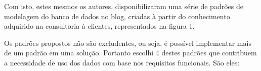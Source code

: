 \documentclass[
	12pt,				%
	openright,			%
	oneside,			%
	a4paper,			%
	english,			%
	french,				%
	spanish,			%
	brazil,				%
	]{abntex2}
\begin{document}
Com isto, estes mesmos os autores, disponibilizaram uma série de padrões de modelagem do banco de dados no blog, criadas à partir do conhecimento adquirido na consultoria à clientes, representados na figura 1.


Os padrões propostos não são excludentes, ou seja, é possível implementar mais de um padrão em uma solução. Portanto escolhi 4 destes padrões que contribuem a necessidade de uso dos dados com base nos requisitos funcionais. São eles:
\end{document}

